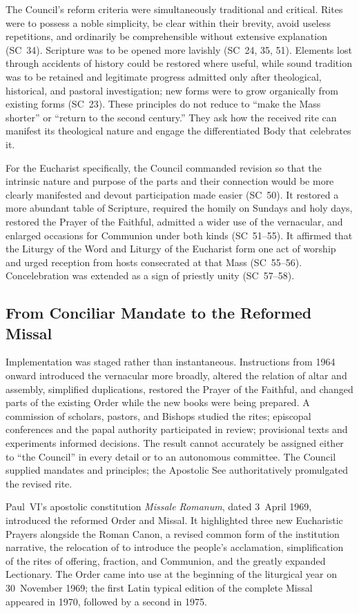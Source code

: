The Council's reform criteria were simultaneously traditional and critical. Rites were to possess a noble simplicity, be clear within their brevity, avoid useless repetitions, and ordinarily be comprehensible without extensive explanation (SC~34). Scripture was to be opened more lavishly (SC~24, 35, 51). Elements lost through accidents of history could be restored where useful, while sound tradition was to be retained and legitimate progress admitted only after theological, historical, and pastoral investigation; new forms were to grow organically from existing forms (SC~23). These principles do not reduce to ``make the Mass shorter'' or ``return to the second century.'' They ask how the received rite can manifest its theological nature and engage the differentiated Body that celebrates it.

For the Eucharist specifically, the Council commanded revision so that the intrinsic nature and purpose of the parts and their connection would be more clearly manifested and devout participation made easier (SC~50). It restored a more abundant table of Scripture, required the homily on Sundays and holy days, restored the Prayer of the Faithful, admitted a wider use of the vernacular, and enlarged occasions for Communion under both kinds (SC~51--55). It affirmed that the Liturgy of the Word and Liturgy of the Eucharist form one act of worship and urged reception from hosts consecrated at that Mass (SC~55--56). Concelebration was extended as a sign of priestly unity (SC~57--58).

\subsection{From Conciliar Mandate to the Reformed Missal}

Implementation was staged rather than instantaneous. Instructions from 1964 onward introduced the vernacular more broadly, altered the relation of altar and assembly, simplified duplications, restored the Prayer of the Faithful, and changed parts of the existing Order while the new books were being prepared. A commission of scholars, pastors, and Bishops studied the rites; episcopal conferences and the papal authority participated in review; provisional texts and experiments informed decisions. The result cannot accurately be assigned either to ``the Council'' in every detail or to an autonomous committee. The Council supplied mandates and principles; the Apostolic See authoritatively promulgated the revised rite.

Paul~VI's apostolic constitution \emph{Missale Romanum}, dated 3~April 1969, introduced the reformed Order and Missal. It highlighted three new Eucharistic Prayers alongside the Roman Canon, a revised common form of the institution narrative, the relocation of  to introduce the people's acclamation, simplification of the rites of offering, fraction, and Communion, and the greatly expanded Lectionary. The Order came into use at the beginning of the liturgical year on 30~November 1969; the first Latin typical edition of the complete Missal appeared in 1970, followed by a second in 1975.

